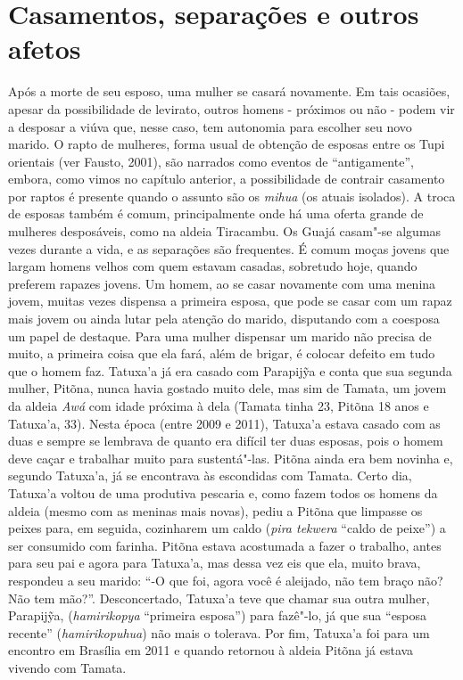 \section{Casamentos, separações e outros
afetos}\label{casamentos-separauxe7uxf5es-e-outros-afetos}

Após a morte de seu esposo, uma mulher se casará novamente. Em tais
ocasiões, apesar da possibilidade de levirato, outros homens - próximos
ou não - podem vir a desposar a viúva que, nesse caso, tem autonomia
para escolher seu novo marido. O rapto de mulheres, forma usual de
obtenção de esposas entre os Tupi orientais (ver Fausto, 2001), são
narrados como eventos de ``antigamente'', embora, como vimos no capítulo
anterior, a possibilidade de contrair casamento por raptos é presente
quando o assunto são os \emph{mihua} (os atuais isolados). A troca de
esposas também é comum, principalmente onde há uma oferta grande de
mulheres desposáveis, como na aldeia Tiracambu. Os Guajá casam"-se
algumas vezes durante a vida, e as separações são frequentes. É comum
moças jovens que largam homens velhos com quem estavam casadas,
sobretudo hoje, quando preferem rapazes jovens. Um homem, ao se casar
novamente com uma menina jovem, muitas vezes dispensa a primeira esposa,
que pode se casar com um rapaz mais jovem ou ainda lutar pela atenção do
marido, disputando com a coesposa um papel de destaque. Para uma mulher
dispensar um marido não precisa de muito, a primeira coisa que ela fará,
além de brigar, é colocar defeito em tudo que o homem faz. Tatuxa'a já
era casado com Parapijỹa e conta que sua segunda mulher, Pitõna, nunca
havia gostado muito dele, mas sim de Tamata, um jovem da aldeia
\emph{Awá} com idade próxima à dela (Tamata tinha 23, Pitõna 18 anos e
Tatuxa'a, 33). Nesta época (entre 2009 e 2011), Tatuxa'a estava casado
com as duas e sempre se lembrava de quanto era difícil ter duas esposas,
pois o homem deve caçar e trabalhar muito para sustentá"-las. Pitõna
ainda era bem novinha e, segundo Tatuxa'a, já se encontrava às
escondidas com Tamata. Certo dia, Tatuxa'a voltou de uma produtiva
pescaria e, como fazem todos os homens da aldeia (mesmo com as meninas
mais novas), pediu a Pitõna que limpasse os peixes para, em seguida,
cozinharem um caldo (\emph{pira tekwera} ``caldo de peixe'') a ser
consumido com farinha. Pitõna estava acostumada a fazer o trabalho,
antes para seu pai e agora para Tatuxa'a, mas dessa vez eis que ela,
muito brava, respondeu a seu marido: ``-O que foi, agora você é
aleijado, não tem braço não? Não tem mão?''. Desconcertado, Tatuxa'a teve
que chamar sua outra mulher, Parapijỹa, (\emph{hamirikopya} ``primeira
esposa'') para fazê"-lo, já que sua ``esposa recente''
(\emph{hamirikopuhua}) não mais o tolerava. Por fim, Tatuxa'a foi para
um encontro em Brasília em 2011 e quando retornou à aldeia Pitõna já
estava vivendo com Tamata.

